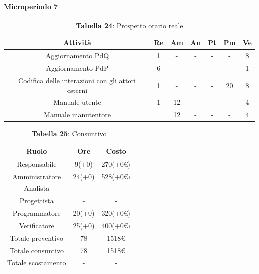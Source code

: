 \paragraph{Microperiodo 7}
\begin{table}[H]
	\centering
	\begin{tabular}{|c|c|c|c|c|c|c|}
		\hline
		\rowcolor{lighter-grayer}
		\textbf{Attività} & \textbf{Re}        & \textbf{Am}        & \textbf{An}        & \textbf{Pt}        & \textbf{Pm}        & \textbf{Ve}        \\ \hline
		
		Aggiornamento PdQ   & 1 & -  & - & - & - & 8 \\ \hline
		Aggiornamento PdP   & 6 & -  & - & - & - & 1 \\ \hline
		Codifica delle interazioni con gli attori esterni & 1           & -           & -           & -           & 20          & 8           \\ \hline
		Manuale utente      & 1 & 12 & - & - & - & 4 \\ \hline
		Manuale manutentore &   & 12 & - & - & - & 4 \\ \hline
	
	\end{tabular}
	\caption*{\textbf{Tabella 24}: Prospetto orario reale\\}
\end{table}

\begin{table}[H]
	\centering
	\renewcommand{\arraystretch}{1.5}
	\begin{tabular}{|c|c|c|}
		\hline
		\rowcolor{lighter-grayer}
		Ruolo & Ore & Costo \\ \hline
		Responsabile & 9(+0) & 270(+0\euro) \\ \hline
		Amministratore & 24(+0) & 528(+0\euro) \\ \hline
		Analista & - & - \\ \hline
		Progettista & - & - \\ \hline
		Programmatore & 20(+0) & 320(+0\euro) \\ \hline
		Verificatore & 25(+0) & 400(+0\euro) \\ \hline
		Totale preventivo & 78 & 1518\euro \\ \hline
		Totale consuntivo & 78 & 1518\euro \\ \hline
		Totale scostamento & - & - \\ \hline
	\end{tabular}
	\caption*{\textbf{Tabella 25}: Consuntivo\\}
\end{table}

